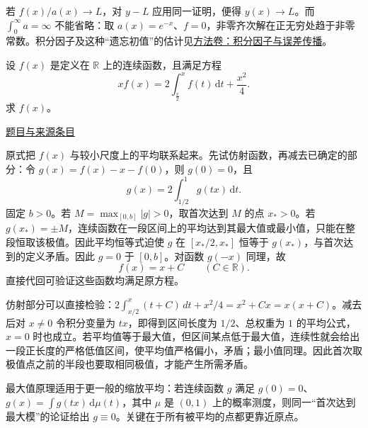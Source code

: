 \documentclass[12pt,fontset=fandol]{ctexart}
\begin{document}
\begin{remark}[方法与条件]若 $f(x)/a(x)\to L$，对 $y-L$ 应用同一证明，便得 $y(x)\to L$。而 $\int_0^\infty a=\infty$ 不能省略：取 $a(x)=e^{-x}$、$f=0$，非零齐次解在正无穷处趋于非零常数。积分因子及这种“遗忘初值”的估计见\hyperref[app:dynamics-factor]{方法卷：积分因子与误差传播}。\end{remark}

\begin{example}\label{ex:fin07-lo:9}\label{pr:fin07-lo:9}

设 $f(x)$ 是定义在 $\mathbb{R}$ 上的连续函数，且满足方程
\[
xf(x)=2\int_{\frac{x}{2}}^{x}f(t)\,\mathrm{d}t+\frac{x^{2}}{4}.
\]
求 $f(x)$。

\par\href{https://github.com/lzxcr/cmc-mathematics/blob/64916fa1fdbc3e444a652eca204d5669058ee321/src/problems/finals/07/10.md}{题目与来源条目}

\end{example}

\begin{solve}\label{ans:fin07-lo:9}

原式把 $f(x)$ 与较小尺度上的平均联系起来。先试仿射函数，再减去已确定的部分：令 $g(x)=f(x)-x-f(0)$，则 $g(0)=0$，且
\[
g(x)=2\int_{1/2}^1g(tx)\,\mathrm{d}t.
\]
固定 $b>0$。若 $M=\max_{[0,b]}|g|>0$，取首次达到 $M$ 的点 $x_*>0$。若 $g(x_*)=\pm M$，连续函数在一段区间上的平均达到其最大值或最小值，只能在整段恒取该极值。因此平均恒等式迫使 $g$ 在 $[x_*/2,x_*]$ 恒等于 $g(x_*)$，与首次达到的定义矛盾。因此 $g=0$ 于 $[0,b]$。对函数 $g(-x)$ 同理，故
\[
f(x)=x+C\qquad(C\in\mathbb R).
\]
直接代回可验证这些函数均满足原方程。

仿射部分可以直接检验：$2\int_{x/2}^x(t+C)\,dt+x^2/4=x^2+Cx=x(x+C)$。减去后对 $x\ne0$ 令积分变量为 $tx$，即得到区间长度为 $1/2$、总权重为 $1$ 的平均公式，$x=0$ 时也成立。若平均值等于最大值，但区间某点低于最大值，连续性就会给出一段正长度的严格低值区间，使平均值严格偏小，矛盾；最小值同理。因此首次取极值点之前的半段也要取相同极值，才能产生所需矛盾。

\end{solve}

\begin{remark}[方法与条件]最大值原理适用于更一般的缩放平均：若连续函数 $g$ 满足 $g(0)=0$、$g(x)=\int g(tx)\,\mathrm d\mu(t)$，其中 $\mu$ 是 $(0,1)$ 上的概率测度，则同一“首次达到最大模”的论证给出 $g\equiv0$。关键在于所有被平均的点都更靠近原点。\end{remark}
\end{document}
